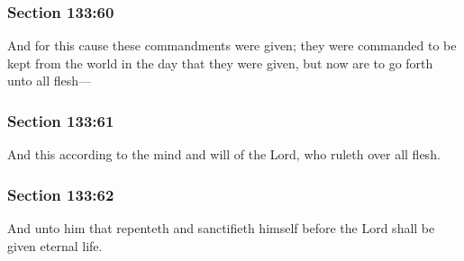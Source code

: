	\subsubsection{Section 133:60} %
		\label{DC133-60}

		And for this cause these commandments were given; they were commanded to be kept from the world in the day that they were given, but now are to go forth unto all flesh---


	\subsubsection{Section 133:61} %
		\label{DC133-61}

		And this according to the mind and will of the Lord, who ruleth over all flesh.


	\subsubsection{Section 133:62} %
		\label{DC133-62}

		And unto him that repenteth and sanctifieth himself before the Lord shall be given eternal life.


